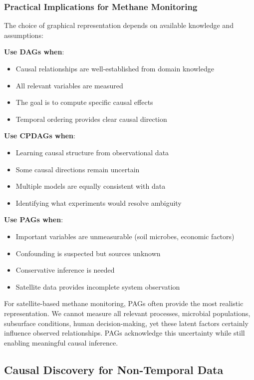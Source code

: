 \subsubsection{Practical Implications for Methane Monitoring}

The choice of graphical representation depends on available knowledge and assumptions:

\textbf{Use DAGs when}:
\begin{itemize}
\item Causal relationships are well-established from domain knowledge
\item All relevant variables are measured
\item The goal is to compute specific causal effects
\item Temporal ordering provides clear causal direction
\end{itemize}

\textbf{Use CPDAGs when}:
\begin{itemize}
\item Learning causal structure from observational data
\item Some causal directions remain uncertain
\item Multiple models are equally consistent with data
\item Identifying what experiments would resolve ambiguity
\end{itemize}

\textbf{Use PAGs when}:
\begin{itemize}
\item Important variables are unmeasurable (soil microbes, economic factors)
\item Confounding is suspected but sources unknown
\item Conservative inference is needed
\item Satellite data provides incomplete system observation
\end{itemize}

For satellite-based methane monitoring, PAGs often provide the most realistic representation. We cannot measure all relevant processes, microbial populations, subsurface conditions, human decision-making, yet these latent factors certainly influence observed relationships. PAGs acknowledge this uncertainty while still enabling meaningful causal inference.

\subsection{Causal Discovery for Non-Temporal Data}

